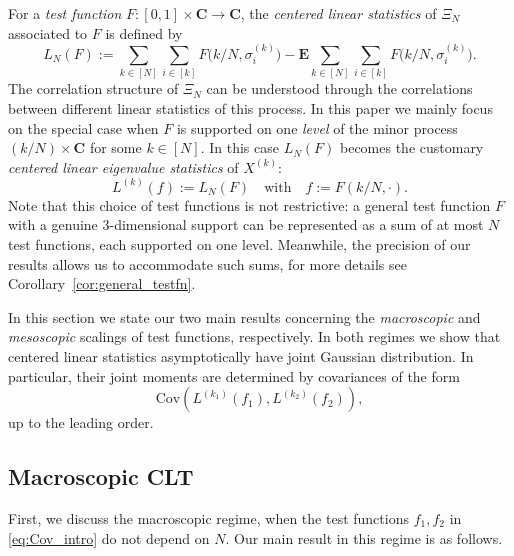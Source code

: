 \documentclass[10pt]{amsart}
\numberwithin{equation}{section}
\newcommand{\E}{\mathbf{E}}
\newcommand{\C}{\mathbf{C}}
\newcommand{\Cov}{\mathrm{Cov}}
\begin{document}
For a \emph{test function} $F:[0,1]\times\C\to\C$, the \emph{centered linear statistics} of $\Xi_N$ associated to $F$ is defined by  
\begin{equation}
L_N(F):= \sum_{k\in [N]} \sum_{i\in [k]} F\big(k/N, \sigma_i^{(k)}\big)-\E \sum_{k\in [N]} \sum_{i\in [k]} F\big(k/N, \sigma_i^{(k)}\big).
\end{equation}
The correlation structure of $\Xi_N$ can be understood through the correlations between different linear statistics of this process. In this paper we mainly focus on the special case when $F$ is supported on one \emph{level} of the minor process $(k/N)\times \C$ for some $k\in[N]$. In this case $L_N(F)$ becomes the customary \emph{centered linear eigenvalue statistics} of $X^{(k)}$: 
\begin{equation}
L^{(k)}(f):=L_N(F)\quad\text{with}\quad f:=F(k/N,\cdot).
\end{equation}
Note that this choice of test functions is not restrictive: a general test function $F$ with a genuine 3-dimensional support can be represented as a sum of at most $N$ test functions, each supported on one level. Meanwhile, the precision of our results allows us to accommodate such sums, for more details see Corollary~\ref{cor:general_testfn}.


In this section we state our two main results concerning the \emph{macroscopic} and \emph{mesoscopic} scalings of test functions, respectively. In both regimes we show that centered linear statistics asymptotically have joint Gaussian distribution. In particular, their joint moments are determined by covariances of the form   
\begin{equation}
\Cov\left(L^{(k_1)}(f_1),L^{(k_2)}(f_2)\right),
\label{eq:Cov_intro}
\end{equation}
up to the leading order. 

\subsection{Macroscopic CLT}\label{sec:macroCLT}

First, we discuss the macroscopic regime, when the test functions $f_1,f_2$ in \eqref{eq:Cov_intro} do not depend on $N$. Our main result in this regime is as follows. 
\end{document}
